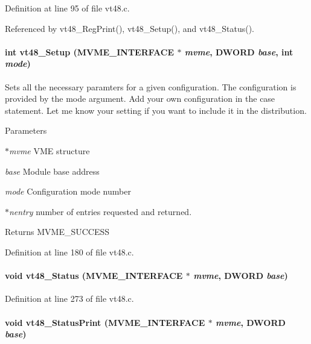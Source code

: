 Definition at line 95 of file vt48.c.

Referenced by vt48\_\-RegPrint(), vt48\_\-Setup(), and vt48\_\-Status().
\paragraph[{vt48\_\-Setup}]{\setlength{\rightskip}{0pt plus 5cm}int vt48\_\-Setup ({\bf MVME\_\-INTERFACE} $\ast$ {\em mvme}, \/  {\bf DWORD} {\em base}, \/  int {\em mode})}\hfill\label{vt48_8h_aa6237edcb797fb9ebb0d447a5b1edbcd}
Sets all the necessary paramters for a given configuration. The configuration is provided by the mode argument. Add your own configuration in the case statement. Let me know your setting if you want to include it in the distribution. 
\begin{DoxyParams}{Parameters}
\item[{\em $\ast$mvme}]VME structure \item[{\em base}]Module base address \item[{\em mode}]Configuration mode number \item[{\em $\ast$nentry}]number of entries requested and returned. \end{DoxyParams}
\begin{DoxyReturn}{Returns}
MVME\_\-SUCCESS 
\end{DoxyReturn}


Definition at line 180 of file vt48.c.
\paragraph[{vt48\_\-Status}]{\setlength{\rightskip}{0pt plus 5cm}void vt48\_\-Status ({\bf MVME\_\-INTERFACE} $\ast$ {\em mvme}, \/  {\bf DWORD} {\em base})}\hfill\label{vt48_8h_a8c2825023005fcd48c424e75dde70ce3}


Definition at line 273 of file vt48.c.
\paragraph[{vt48\_\-StatusPrint}]{\setlength{\rightskip}{0pt plus 5cm}void vt48\_\-StatusPrint ({\bf MVME\_\-INTERFACE} $\ast$ {\em mvme}, \/  {\bf DWORD} {\em base})}\hfill\label{vt48_8h_a34be3807ff5960444ca76cb7a7b39c04}
